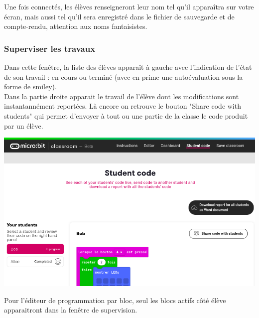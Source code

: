 \begin{remarque}
    Une fois connectés, les élèves renseigneront leur nom tel qu'il apparaîtra sur votre écran,
    mais aussi tel qu'il sera enregistré dans le fichier de sauvegarde et de compte-rendu, attention
    aux noms fantaisistes.
    
\end{remarque}

\vspace{5mm}

\subsubsection{Superviser les travaux}

\begin{methode}
        Dans cette fenêtre, la liste des élèves apparaît à gauche avec l'indication 
        de l'état de son travail : en cours ou terminé (avec en prime une autoévaluation sous la
        forme de smiley).\\
        Dans la partie droite apparait le travail de l'élève dont les modifications sont instantannément
        reportées. Là encore on retrouve le bouton "Share code with students" qui permet d'envoyer à tout
        ou une partie de la classe le code produit par un élève.

    \vspace{5mm}
    
    \centerline{\includegraphics[width=0.6\linewidth]{res/classroom_studentCode2.png}}
    


\end{methode}

\begin{remarque}
    Pour l'éditeur de programmation par bloc, seul les blocs actifs côté élève
    apparaitront dans la fenêtre de supervision.
    
\end{remarque}


\newpage
\vspace{5mm}~\\


